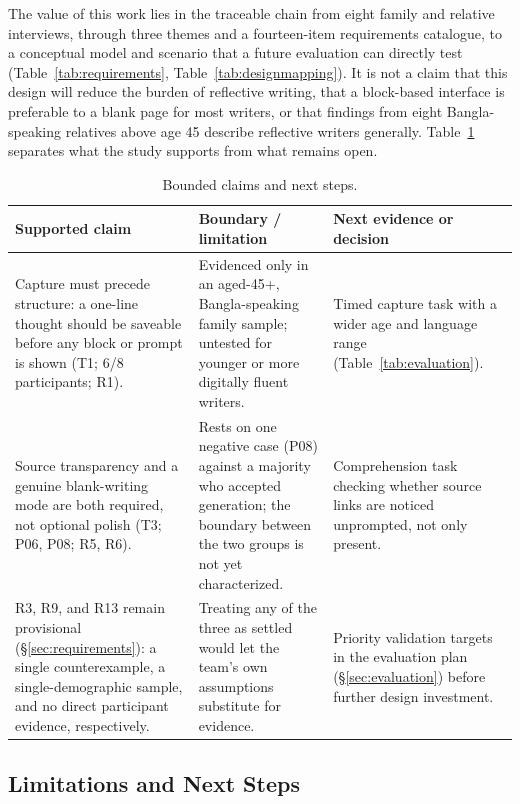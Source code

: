 \documentclass[sigconf,nonacm]{acmart}
\begin{document}
The value of this work lies in the traceable chain from eight family and
relative interviews, through three themes and a fourteen-item requirements
catalogue, to a conceptual model and scenario that a future evaluation can
directly test (Table~\ref{tab:requirements}, Table~\ref{tab:designmapping}).
It is not a claim that this design will reduce the burden of reflective
writing, that a block-based interface is preferable to a blank page for
most writers, or that findings from eight Bangla-speaking relatives above
age 45 describe reflective writers generally. Table~\ref{tab:claims}
separates what the study supports from what remains open.

\begin{table}[tb]
  \centering
  \small
  \caption{Bounded claims and next steps.}
  \label{tab:claims}
  \begin{tabularx}{\textwidth}{@{}X X X@{}}
    \toprule
    Supported claim & Boundary / limitation & Next evidence or decision \\
    \midrule
    Capture must precede structure: a one-line thought should be saveable
    before any block or prompt is shown (T1; 6/8 participants; R1). &
    Evidenced only in an aged-45+, Bangla-speaking family sample; untested
    for younger or more digitally fluent writers. & Timed capture task with
    a wider age and language range (Table~\ref{tab:evaluation}). \\
    Source transparency and a genuine blank-writing mode are both required,
    not optional polish (T3; P06, P08; R5, R6). & Rests on one negative
    case (P08) against a majority who accepted generation; the boundary
    between the two groups is not yet characterized. & Comprehension task
    checking whether source links are noticed unprompted, not only present. \\
    R3, R9, and R13 remain provisional (\S\ref{sec:requirements}): a
    single counterexample, a single-demographic sample, and no direct
    participant evidence, respectively. & Treating any of the three as
    settled would let the team's own assumptions substitute for evidence. &
    Priority validation targets in the evaluation plan
    (\S\ref{sec:evaluation}) before further design investment. \\
    \bottomrule
  \end{tabularx}
\end{table}

\subsection{Limitations and Next Steps}
\label{sec:limitations}
\end{document}
